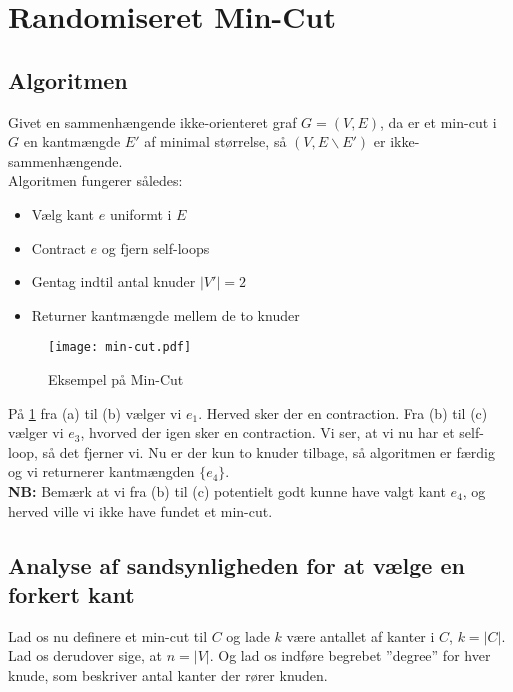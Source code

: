 \section{Randomiseret Min-Cut}
\subsection{Algoritmen}

Givet en sammenhængende ikke-orienteret graf $G = (V, E)$, da er et min-cut i $G$ en kantmængde $E'$ af minimal størrelse, så $(V, E \backslash E')$ er ikke-sammenhængende.\\

Algoritmen fungerer således:
\begin{itemize}
	\item Vælg kant $e$ uniformt i $E$
	\item Contract $e$ og fjern self-loops
	\item Gentag indtil antal knuder $|V'| = 2$
	\item Returner kantmængde mellem de to knuder
\end{itemize}

\begin{figure}[H]
	\begin{center}
		\texttt{[image: min-cut.pdf]}
	\end{center}
	\caption{Eksempel på Min-Cut}
	\label{fig:min-cut}
\end{figure}

På \ref{fig:min-cut} fra (a) til (b) vælger vi $e_1$. Herved sker der en contraction. Fra (b) til (c) vælger vi $e_3$, hvorved der igen sker en contraction. Vi ser, at vi nu har et self-loop, så det fjerner vi. Nu er der kun to knuder tilbage, så algoritmen er færdig og vi returnerer kantmængden $\{e_4\}$.\\

\textbf{NB:} Bemærk at vi fra (b) til (c) potentielt godt kunne have valgt kant $e_4$, og herved ville vi ikke have fundet et min-cut.





\subsection{Analyse af sandsynligheden for at vælge en forkert kant}
Lad os nu definere et min-cut til $C$ og lade $k$ være antallet af kanter i $C$, $k = |C|$. Lad os derudover sige, at $n = |V|$. Og lad os indføre begrebet ''degree'' for hver knude, som beskriver antal kanter der rører knuden.\\


